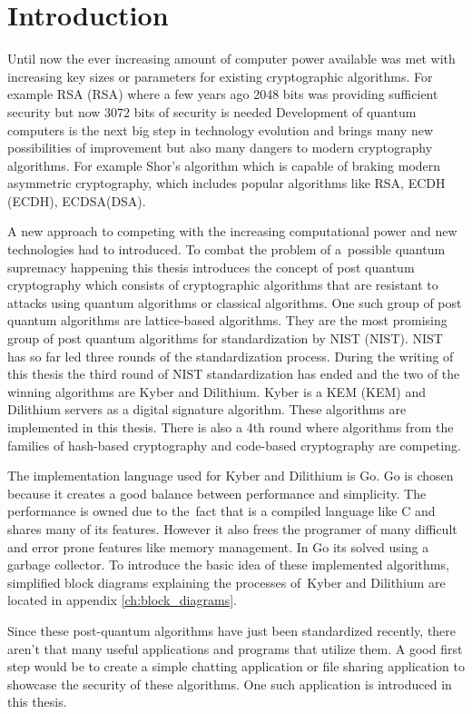 \chapter*{Introduction}
{}

Until now the ever increasing amount of computer power available was met with increasing key sizes or parameters for existing cryptographic algorithms. For example RSA (\acl{RSA}) where a few years ago 2048 bits was providing sufficient security but now 3072 bits of security is needed Development of quantum computers is the next big step in technology evolution and brings many new possibilities of improvement but also many dangers to modern cryptography algorithms. For example Shor's algorithm which is capable of braking modern asymmetric cryptography, which includes popular algorithms like RSA, ECDH (\acl{ECDH}), ECDSA(\acl{DSA}).

A new approach to competing with the increasing computational power and new technologies had to introduced. To combat the problem of a~possible quantum supremacy happening this thesis introduces the concept of post quantum cryptography which consists of cryptographic algorithms that are resistant to attacks using quantum algorithms or classical algorithms. One such group of post quantum algorithms are lattice-based algorithms. They are the most promising group of post quantum algorithms for standardization by NIST (\acl{NIST}). NIST has so far led three rounds of the standardization process. During the writing of this thesis the third round of NIST standardization has ended and the two of the winning algorithms are Kyber and Dilithium. Kyber is a KEM (\acl{KEM}) and Dilithium servers as a digital signature algorithm. These algorithms are implemented in this thesis. There is also a 4th round where algorithms from the families of hash-based cryptography and code-based cryptography are competing.

The implementation language used for Kyber and Dilithium is Go. Go is chosen because it creates a good balance between performance and simplicity. The performance is owned due to the~fact that is a compiled language like C and shares many of its features. However it also frees the programer of many difficult and error prone features like memory management. In Go its solved using a garbage collector. To introduce the basic idea of these implemented algorithms, simplified block diagrams explaining the processes of~Kyber and Dilithium are located in appendix \ref{ch:block_diagrams}.

Since these post-quantum algorithms have just been standardized recently, there aren't that many useful applications and programs that utilize them. A good first step would be to create a simple chatting application or file sharing application to showcase the security of these algorithms. One such application is introduced in this thesis.
